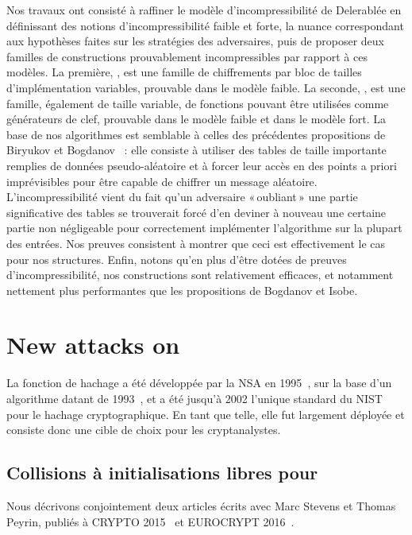 Nos travaux ont consisté à raffiner le modèle d'incompressibilité de Delerablée \etal en définissant des notions d'incompressibilité faible et forte,
la nuance  correspondant aux hypothèses faites sur les stratégies des adversaires, puis de proposer deux familles de constructions
prouvablement incompressibles par rapport à ces modèles. La première, \pc, est une famille de chiffrements par bloc de tailles d'implémentation variables, prouvable dans le modèle
faible. La seconde, \cdb, est une famille, également de taille variable, de fonctions
pouvant être utilisées comme générateurs de clef, prouvable dans le modèle faible et dans le modèle fort. La base de nos algorithmes est semblable à celles des précédentes propositions de Biryukov \etal
et Bogdanov \etal~: elle consiste à utiliser des tables de taille importante remplies de données pseudo-aléatoire et à forcer leur accès en des points a priori imprévisibles pour être capable de
chiffrer un message aléatoire. L'incompressibilité vient du fait qu'un adversaire «\,oubliant\,» une partie significative des tables se trouverait forcé d'en deviner à nouveau une certaine partie
non négligeable
pour correctement implémenter l'algorithme sur la plupart des entrées. Nos preuves consistent à montrer que ceci est effectivement le cas pour nos structures. Enfin, notons qu'en plus d'être
dotées de preuves d'incompressibilité, nos constructions sont relativement efficaces, et notamment nettement plus performantes que les propositions de Bogdanov et Isobe.

\section[Nouvelles attaques sur la fonction de hachage \shaone]{New attacks on \shaone}

La fonction de hachage \shaone a été développée par la NSA en 1995~\cite{Nist-SHA1}, sur la base d'un algorithme datant de 1993~\cite{Nist-SHA0}, et a été jusqu'à 2002 l'unique standard du NIST pour
le hachage cryptographique. En tant que telle, elle fut largement déployée et consiste donc une cible de choix pour les cryptanalystes.

\subsection{Collisions à initialisations libres pour \shaone \cite{DBLP:conf/crypto/KarpmanPS15,DBLP:conf/eurocrypt/StevensKP16}}

Nous décrivons conjointement deux articles écrits avec Marc Stevens et Thomas Peyrin, publiés à CRYPTO 2015~\cite{DBLP:conf/crypto/KarpmanPS15} et EUROCRYPT 2016~\cite{DBLP:conf/eurocrypt/StevensKP16}.


